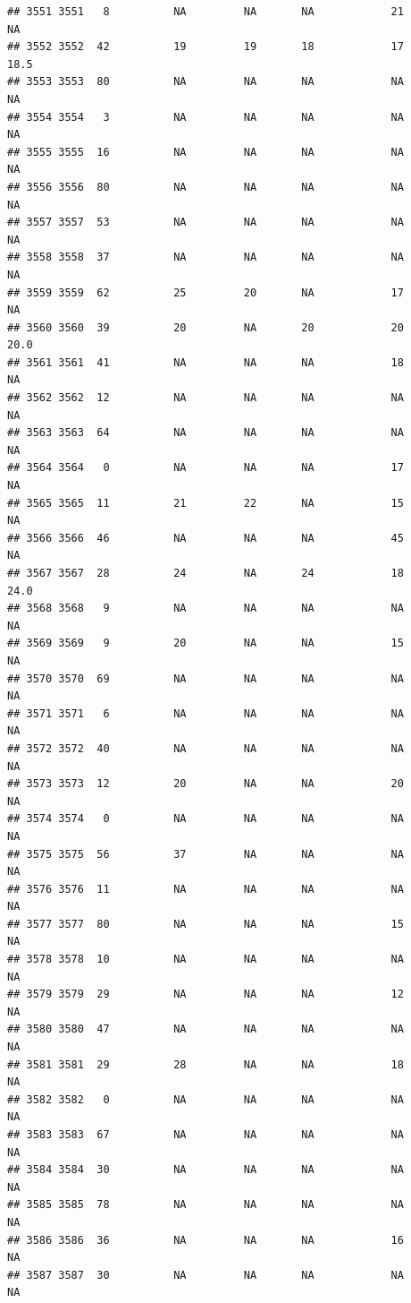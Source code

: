 \documentclass[man]{apa6}
\begin{document}
\begin{verbatim}
## 3551 3551   8          NA         NA       NA            21       NA
## 3552 3552  42          19         19       18            17     18.5
## 3553 3553  80          NA         NA       NA            NA       NA
## 3554 3554   3          NA         NA       NA            NA       NA
## 3555 3555  16          NA         NA       NA            NA       NA
## 3556 3556  80          NA         NA       NA            NA       NA
## 3557 3557  53          NA         NA       NA            NA       NA
## 3558 3558  37          NA         NA       NA            NA       NA
## 3559 3559  62          25         20       NA            17       NA
## 3560 3560  39          20         NA       20            20     20.0
## 3561 3561  41          NA         NA       NA            18       NA
## 3562 3562  12          NA         NA       NA            NA       NA
## 3563 3563  64          NA         NA       NA            NA       NA
## 3564 3564   0          NA         NA       NA            17       NA
## 3565 3565  11          21         22       NA            15       NA
## 3566 3566  46          NA         NA       NA            45       NA
## 3567 3567  28          24         NA       24            18     24.0
## 3568 3568   9          NA         NA       NA            NA       NA
## 3569 3569   9          20         NA       NA            15       NA
## 3570 3570  69          NA         NA       NA            NA       NA
## 3571 3571   6          NA         NA       NA            NA       NA
## 3572 3572  40          NA         NA       NA            NA       NA
## 3573 3573  12          20         NA       NA            20       NA
## 3574 3574   0          NA         NA       NA            NA       NA
## 3575 3575  56          37         NA       NA            NA       NA
## 3576 3576  11          NA         NA       NA            NA       NA
## 3577 3577  80          NA         NA       NA            15       NA
## 3578 3578  10          NA         NA       NA            NA       NA
## 3579 3579  29          NA         NA       NA            12       NA
## 3580 3580  47          NA         NA       NA            NA       NA
## 3581 3581  29          28         NA       NA            18       NA
## 3582 3582   0          NA         NA       NA            NA       NA
## 3583 3583  67          NA         NA       NA            NA       NA
## 3584 3584  30          NA         NA       NA            NA       NA
## 3585 3585  78          NA         NA       NA            NA       NA
## 3586 3586  36          NA         NA       NA            16       NA
## 3587 3587  30          NA         NA       NA            NA       NA

\end{verbatim}
\end{document}
